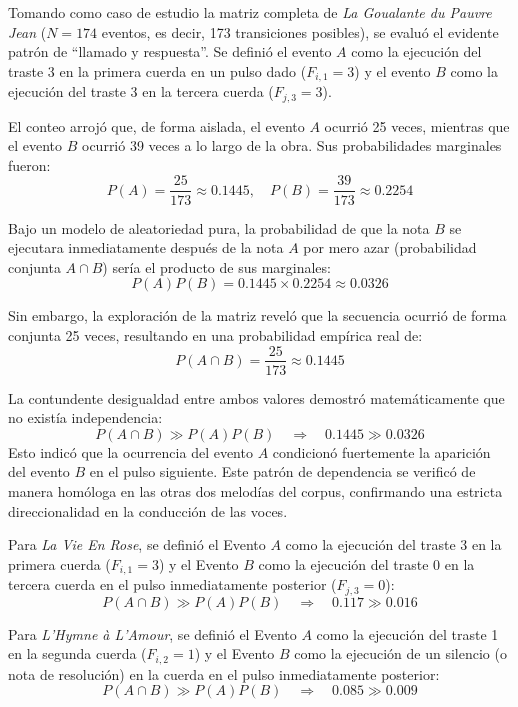 \documentclass{article}
\theoremstyle{plain}
\theoremstyle{definition}
\begin{document}
Tomando como caso de estudio la matriz completa de \textit{La Goualante du Pauvre Jean} ($N=174$ eventos, es decir, 173 transiciones posibles), se evaluó el evidente patrón de ``llamado y respuesta''. Se definió el evento $A$ como la ejecución del traste 3 en la primera cuerda en un pulso dado ($F_{i,1} = 3$) y el evento $B$ como la ejecución del traste 3 en la tercera cuerda ($F_{j,3} = 3$). 

El conteo arrojó que, de forma aislada, el evento $A$ ocurrió 25 veces, mientras que el evento $B$ ocurrió 39 veces a lo largo de la obra. Sus probabilidades marginales fueron:
\[
    P(A) = \frac{25}{173} \approx 0.1445, \quad P(B) = \frac{39}{173} \approx 0.2254
\]

Bajo un modelo de aleatoriedad pura, la probabilidad de que la nota $B$ se ejecutara inmediatamente después de la nota $A$ por mero azar (probabilidad conjunta $A \cap B$) sería el producto de sus marginales:
\[
    P(A)P(B) = 0.1445 \times 0.2254 \approx 0.0326
\]

Sin embargo, la exploración de la matriz reveló que la secuencia ocurrió de forma conjunta 25 veces, resultando en una probabilidad empírica real de:
\[
    P(A \cap B) = \frac{25}{173} \approx 0.1445
\]

La contundente desigualdad entre ambos valores demostró matemáticamente que no existía independencia:
\[
    P(A \cap B) \gg P(A)P(B) \quad \Longrightarrow \quad 0.1445 \gg 0.0326
\]
Esto indicó que la ocurrencia del evento $A$ condicionó fuertemente la aparición del evento $B$ en el pulso siguiente. Este patrón de dependencia se verificó de manera homóloga en las otras dos melodías del corpus, confirmando una estricta direccionalidad en la conducción de las voces.

Para \textit{La Vie En Rose}, se definió el Evento $A$ como la ejecución del traste 3 en la primera cuerda ($F_{i,1} = 3$) y el Evento $B$ como la ejecución del traste 0 en la tercera cuerda en el pulso inmediatamente posterior ($F_{j,3} = 0$):
\[
    P(A \cap B) \gg P(A)P(B) \quad \Longrightarrow \quad 0.117 \gg 0.016
\]

Para \textit{L'Hymne à L'Amour}, se definió el Evento $A$ como la ejecución del traste 1 en la segunda cuerda ($F_{i,2} = 1$) y el Evento $B$ como la ejecución de un silencio (o nota de resolución) en la cuerda en el pulso inmediatamente posterior:
\[
    P(A \cap B) \gg P(A)P(B) \quad \Longrightarrow \quad 0.085 \gg 0.009
\]
\end{document}
